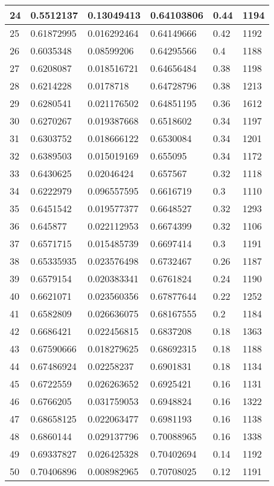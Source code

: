 \begin{longtable}{|l|l|l|l|l|l|}
24 & 0.5512137 & 0.13049413 & 0.64103806 & 0.44 & 1194 \\ \hline 
25 & 0.61872995 & 0.016292464 & 0.64149666 & 0.42 & 1192 \\ \hline 
26 & 0.6035348 & 0.08599206 & 0.64295566 & 0.4 & 1188 \\ \hline 
27 & 0.6208087 & 0.018516721 & 0.64656484 & 0.38 & 1198 \\ \hline 
28 & 0.6214228 & 0.0178718 & 0.64728796 & 0.38 & 1213 \\ \hline 
29 & 0.6280541 & 0.021176502 & 0.64851195 & 0.36 & 1612 \\ \hline 
30 & 0.6270267 & 0.019387668 & 0.6518602 & 0.34 & 1197 \\ \hline 
31 & 0.6303752 & 0.018666122 & 0.6530084 & 0.34 & 1201 \\ \hline 
32 & 0.6389503 & 0.015019169 & 0.655095 & 0.34 & 1172 \\ \hline 
33 & 0.6430625 & 0.02046424 & 0.657567 & 0.32 & 1118 \\ \hline 
34 & 0.6222979 & 0.096557595 & 0.6616719 & 0.3 & 1110 \\ \hline 
35 & 0.6451542 & 0.019577377 & 0.6648527 & 0.32 & 1293 \\ \hline 
36 & 0.645877 & 0.022112953 & 0.6674399 & 0.32 & 1106 \\ \hline 
37 & 0.6571715 & 0.015485739 & 0.6697414 & 0.3 & 1191 \\ \hline 
38 & 0.65335935 & 0.023576498 & 0.6732467 & 0.26 & 1187 \\ \hline 
39 & 0.6579154 & 0.020383341 & 0.6761824 & 0.24 & 1190 \\ \hline 
40 & 0.6621071 & 0.023560356 & 0.67877644 & 0.22 & 1252 \\ \hline 
41 & 0.6582809 & 0.026636075 & 0.68167555 & 0.2 & 1184 \\ \hline 
42 & 0.6686421 & 0.022456815 & 0.6837208 & 0.18 & 1363 \\ \hline 
43 & 0.67590666 & 0.018279625 & 0.68692315 & 0.18 & 1188 \\ \hline 
44 & 0.67486924 & 0.02258237 & 0.6901831 & 0.18 & 1134 \\ \hline 
45 & 0.6722559 & 0.026263652 & 0.6925421 & 0.16 & 1131 \\ \hline 
46 & 0.6766205 & 0.031759053 & 0.6948824 & 0.16 & 1322 \\ \hline 
47 & 0.68658125 & 0.022063477 & 0.6981193 & 0.16 & 1138 \\ \hline 
48 & 0.6860144 & 0.029137796 & 0.70088965 & 0.16 & 1338 \\ \hline 
49 & 0.69337827 & 0.026425328 & 0.70402694 & 0.14 & 1192 \\ \hline 
50 & 0.70406896 & 0.008982965 & 0.70708025 & 0.12 & 1191 \\ \hline 
\end{longtable}